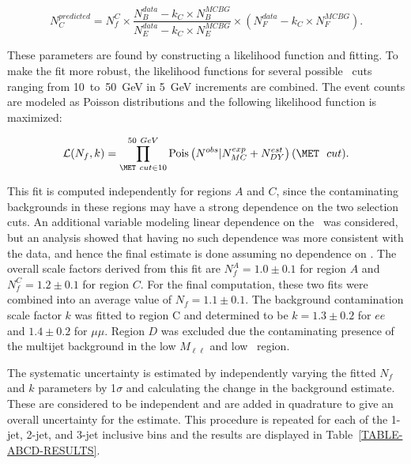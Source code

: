 \begin{equation}
N_{C}^{predicted} = N_{f}^{C} \times \frac{N_{B}^{data}-k_{C}\times N_{B}^{MCBG}}{N_{E}^{data}-k_{C}\times N_{E}^{MCBG}} \times (N_{F}^{data}-k_{C}\times N_{F}^{MCBG}).
\end{equation} 

\noindent
These parameters are found by constructing a likelihood function and fitting. To make the fit more robust, the likelihood functions for several possible \MET\ cuts ranging from \mbox{10 to 50 GeV} in \mbox{5 GeV} increments are combined. The event counts are modeled as Poisson distributions and the following likelihood function is maximized:

\begin{equation}
\mathcal{L}(N_f,k) = \prod_{\MET\ cut \in 10}^{50\ GeV} \textrm{Pois} \left (N^{obs}|N^{exp}_{MC}+N^{est}_{DY}  \right) (\MET\ ~cut ).
\end{equation}

\noindent
This fit is computed independently for regions $A$ and $C$, since the contaminating backgrounds in these regions may have a strong dependence on the two selection cuts. An additional variable modeling linear dependence on the \MET\ was considered, but an analysis showed that having no such dependence was more consistent with the data, and hence the final estimate is done assuming no dependence on \MET. The overall scale factors derived from this fit are $N_{f}^A = 1.0 \pm 0.1$ for region $A$ and $N_f^C=1.2\pm 0.1$ for region $C$. For the final computation, these two fits were combined into an average value of $N_{f} = 1.1 \pm 0.1$. The background contamination scale factor $k$ was fitted to region C and determined to be $k = 1.3 \pm 0.2$ for $ee$ and $1.4\pm0.2$ for $\mu\mu$. Region $D$ was excluded due the contaminating presence of the multijet background in the low $M_{\ell\ell}$ and low \MET\ region.

The systematic uncertainty is estimated by independently varying the fitted $N_f$ and $k$ parameters by 1$\sigma$ and calculating the change in the background estimate. These are considered to be independent and are added in quadrature to give an overall uncertainty for the estimate. This procedure is repeated for each of the 1-jet, 2-jet, and 3-jet inclusive bins and the results are displayed in Table~\ref{TABLE-ABCD-RESULTS}.

